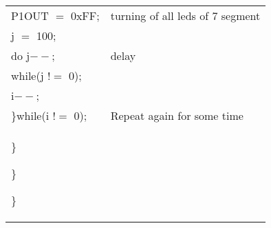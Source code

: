 \documentclass[12pt, letterpaper]{article}
\begin{document}
\begin{longtable}{|p{6cm}||p{5cm}|}
            \hspace{0.5cm}    P1OUT $=$ 0xFF; & turning of all leds of 7 segment\\
            \hspace{0.5cm}    j $=$ 100; & \\
            \hspace{0.5cm}    do j$--$; & delay\\
            \hspace{0.5cm}    while(j $!=$ 0); & \\


             \hspace{0.5cm}   i$--$; & \\
          \hspace{0.5cm}  \}while(i $!=$ 0); &  Repeat again for some time\\
       \hspace{0.3cm} \}

  \hspace{0.1cm} \}
   
\}

\end{longtable}
\newpage
\end{document}
